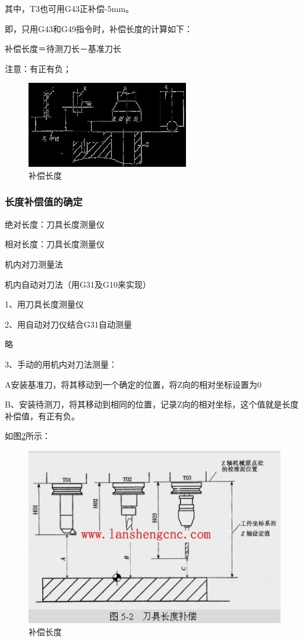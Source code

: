 其中，T3也可用G43正补偿-5mm。

即，只用G43和G49指令时，补偿长度的计算如下：

补偿长度＝待测刀长－基准刀长 

注意：有正有负；

\begin{figure}[h]
	\centering
	\includegraphics[width=0.7\linewidth]{data/image/24-2}
	\caption{补偿长度}
	\label{fig:24-2}
\end{figure}
\subsubsection{长度补偿值的确定}

绝对长度：刀具长度测量仪

相对长度：刀具长度测量仪

机内对刀测量法

机内自动对刀法（用G31及G10来实现）

1、用刀具长度测量仪



2、用自动对刀仪结合G31自动测量

略

3、手动的用机内对刀法测量：

A安装基准刀，将其移动到一个确定的位置，将Z向的相对坐标设置为0

B、安装待测刀，将其移动到相同的位置，记录Z向的相对坐标，这个值就是长度补偿值，有正有负。

如图\ref{fig:24-3}所示：
\begin{figure}[h]
	\centering
	\includegraphics[width=0.7\linewidth]{data/image/24-3}
	\caption{补偿长度}
	\label{fig:24-3}
\end{figure}

